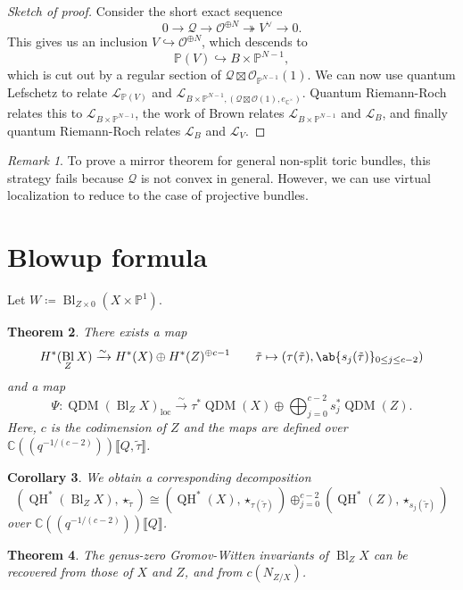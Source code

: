 \documentclass{amsart}
\newtheorem{thm}{Theorem}[section]
\newtheorem{cor}[thm]{Corollary}
\theoremstyle{definition}
\theoremstyle{remark}
\newtheorem{rmk}[thm]{Remark}
\theoremstyle{plain}
\theoremstyle{definition}
\theoremstyle{remark}
\newcommand{\C}{\mathbb{C}}
\renewcommand{\P}{\mathbb{P}}
\renewcommand{\mc}[1]{\mathcal{#1}}
\newcommand{\mr}[1]{\mathrm{#1}}
\newcommand{\1}{\mathbf{1}}
\newcommand{\2}{\mathbf{2}}
\newcommand{\3}{\mathbf{3}}
\newcommand{\ps}[1]{\lBrack #1 \rBrack}
\newcommand{\ls}[1]{(\!( #1 )\!)}
\DeclareMathOperator{\Bl}{Bl}
\DeclareMathOperator{\QH}{QH}
\DeclareMathOperator{\QDM}{QDM}
\begin{document}
\begin{proof}[Sketch of proof]
    Consider the short exact sequence
    \[ 0 \to \mc{Q} \to \mc{O}^{\oplus N} \twoheadrightarrow V^{\vee} \to 0. \]
    This gives us an inclusion \(V \hookrightarrow \mc{O}^{\oplus N}\), which descends to
    \[ \P(V) \hookrightarrow B \times \P^{N-1}, \]
    which is cut out by a regular section of \(\mc{Q} \boxtimes \mc{O}_{\P^{N-1}}(1)\). We can now use quantum Lefschetz to relate \(\mc{L}_{\P(V)}\) and \(\mc{L}_{B \times \P^{N-1}, (\mc{Q} \boxtimes \mc{O}(1), e_{\C^{\times}})}\). Quantum Riemann-Roch relates this to \(\mc{L}_{B \times \P^{N-1}}\), the work of Brown relates \(\mc{L}_{B \times \P^{N-1}}\) and \(\mc{L}_B\), and finally quantum Riemann-Roch relates \(\mc{L}_B\) and \(\mc{L}_V\). 
\end{proof}

\begin{rmk}
    To prove a mirror theorem for general non-split toric bundles, this strategy fails because \(\mc{Q}\) is not convex in general. However, we can use virtual localization to reduce to the case of projective bundles.
\end{rmk}

\section{Blowup formula}%
\label{sec:Blowup formula}

Let \(W \coloneqq \Bl_{Z \times 0} (X \times \P^1)\).

\begin{thm}
    There exists a map
    \[ H^*(\Bl_Z X) \xrightarrow{\sim} H^*(X) \oplus H^*(Z)^{\oplus c-1} \qquad \tilde{\tau} \mapsto (\tau(\tilde{\tau}), \ab\{ s_j(\tilde{\tau})\}_{0 \leq j \leq c-2}) \]
    and a map
    \[ \Psi \colon \QDM(\Bl_Z X)_{\mr{loc}} \xrightarrow{\sim} \tau^* \QDM(X) \oplus \bigoplus_{j=0}^{c-2} s_j^* \QDM(Z). \]
    Here, \(c\) is the codimension of \(Z\) and the maps are defined over \(\C \ls{q^{-1/(c-2)}} \ps{Q, \tilde{\tau}}\).
\end{thm}

\begin{cor}
    We obtain a corresponding decomposition
    \[ (\QH^*(\Bl_Z X), \star_{\tilde{\tau}}) \cong (\QH^*(X), \star_{\tau(\tilde{\tau})}) \oplus_{j=0}^{c-2} (\QH^*(Z), \star_{s_j(\tilde{\tau})}) \]
    over \(\C \ls{q^{-1/(c-2)}} \ps{Q}\).
\end{cor}

\begin{thm}
    The genus-zero Gromov-Witten invariants of \(\Bl_Z X\) can  be recovered from those of \(X\) and \(Z\), and from \(c(N_{Z/X})\).
\end{thm}
\end{document}
